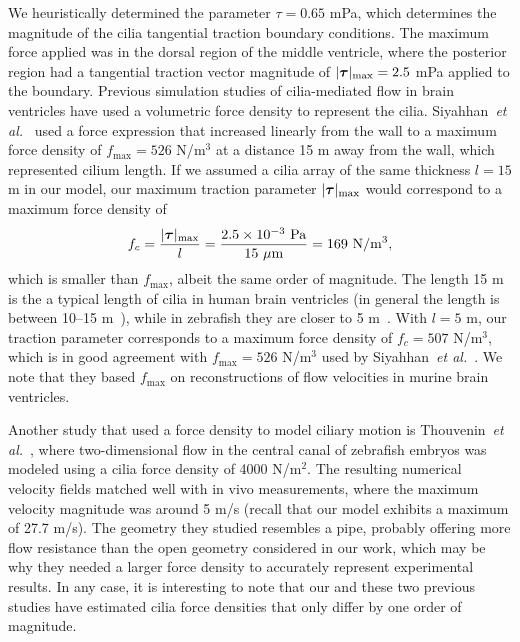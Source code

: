 \documentclass{WileyMSP-template}
\begin{document}
We heuristically determined the parameter $\tau = 0.65$ mPa, which determines
the magnitude of the cilia tangential traction boundary conditions. The maximum force applied
was in the dorsal region of the middle ventricle, where the posterior region had a tangential
traction vector magnitude of $\vert\bm{\tau}\vert_{\mathrm{max}} = 2.5$ mPa applied to the
boundary. Previous simulation studies of cilia-mediated flow in brain ventricles have
used a volumetric force density to represent the cilia.
Siyahhan~\emph{et al.}~\cite{Siyahhan2014FlowVentricles}
used a force expression that increased linearly from the wall to a maximum force density of
$f_{\mathrm{max}} = 526$ N/$\mathrm{m^3}$ at a distance 15 \textmu m away from the wall,
which represented cilium length. If we assumed a cilia array of the same thickness
$l = 15$ \textmu m in our model, our maximum traction parameter $\vert\bm{\tau}\vert_{\mathrm{max}}$
would correspond to a maximum force density of 
\begin{equation*}
    f_c = \frac{\vert\bm{\tau}\vert_{\mathrm{max}}}{l}
        = \frac{\num{2.5e-3} \ \mathrm{Pa}}{15 \ \mu\mathrm{m}}
        = 169 \ \mathrm{N/m^3},
\end{equation*}
which is smaller than $f_{\mathrm{max}}$, albeit the same order of magnitude.
The length 15 \textmu m is the a typical length of cilia in human brain ventricles
(in general the length is between 10--15 \textmu m~\cite{Afzelius2004Cilia-relatedDiseases}),
while in zebrafish they are closer to 5 \textmu m~\cite{Salman2022ComputationalEmbryo}.
With $l=5$ \textmu m, our traction parameter corresponds to a maximum force density of
$f_c=507$ N/$\mathrm{m^3}$, which is in good agreement with
$f_{\mathrm{max}} = 526$ N/$\mathrm{m^3}$
used by Siyahhan~\emph{et al.}~\cite{Siyahhan2014FlowVentricles}.
We note that they based $f_{\mathrm{max}}$ on reconstructions of
flow velocities in murine brain ventricles.

Another study that used a force density to model ciliary motion is
Thouvenin~\emph{et al.}~\cite{Thouvenin2020OriginCanal}, where two-dimensional flow
in the central canal of zebrafish embryos was modeled using a cilia force density of
4000 N/$\mathrm{m^2}$. The resulting numerical velocity fields matched well with
in vivo measurements, where the maximum velocity magnitude was around 5 \textmu m/s
(recall that our model exhibits a maximum of 27.7 \textmu m/s).
The geometry they studied resembles a pipe, probably offering more flow resistance
than the open geometry considered in our work, which may be why they needed a larger
force density to accurately represent experimental results. In any case, it is
interesting to note that our and these two previous studies have estimated
cilia force densities that only differ by one order of magnitude. 
\end{document}
